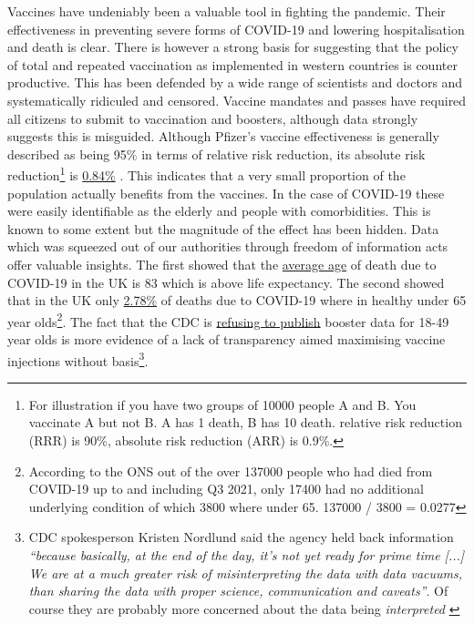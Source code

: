 \documentclass[11pt,a4paper,notitlepage]{report}
\begin{document}
Vaccines have undeniably been a valuable tool in fighting the pandemic. Their effectiveness in preventing severe forms of COVID-19 and lowering hospitalisation and death is clear. There is however a strong basis for suggesting that the policy of total and repeated vaccination as implemented in western countries is counter productive. This has been defended by a wide range of scientists and doctors and systematically ridiculed and censored. Vaccine mandates and passes have required all citizens to submit to vaccination and boosters, although data strongly suggests this is misguided. Although Pfizer's vaccine effectiveness is generally described as being 95\% in terms of relative risk reduction, its absolute risk reduction\footnote{For illustration if you have two groups of 10000 people A and B. You vaccinate A but not B. A has 1 death, B has 10 death. relative risk reduction (RRR) is 90\%, absolute risk reduction (ARR) is 0.9\%.} is \href{https://www.thelancet.com/journals/lanmic/article/PIIS2666-5247(21)00069-0/fulltext}{0.84\%} \cite{lancet20042021}. This indicates that a very small proportion of the population actually benefits from the vaccines. In the case of COVID-19 these were easily identifiable as the elderly and people with comorbidities. This is known to some extent but the magnitude of the effect has been hidden. Data which was squeezed out of our authorities through freedom of information acts offer valuable insights. The first showed that the \href{https://www.ons.gov.uk/aboutus/transparencyandgovernance/freedomofinformationfoi/averageageofthosewhohaddiedwithcovid19}{average age} of death due to COVID-19 in the UK is 83 \cite{freedomofinformationfoi11012021} which is above life expectancy. The second showed that in the UK only \href{https://www.ons.gov.uk/aboutus/transparencyandgovernance/freedomofinformationfoi/deathsfromcovid19withnootherunderlyingcauses}{2.78\%} \cite{freedomofinformationfoi16122021} of deaths due to COVID-19 where in healthy under 65 year olds\footnote{According to the ONS \cite{freedomofinformationfoi16122021} out of the over 137000 people who had died from COVID-19 up to and including Q3 2021, only 17400 had no additional underlying condition of which 3800 where under 65. 137000 / 3800 = 0.0277}. The fact that the CDC is \href{https://www.webmd.com/lung/news/20220222/report-cdc-not-publishing-large-amounts-of-covid-19-data}{refusing to publish} \cite{webmd22022022} booster data for 18-49 year olds is more evidence of a lack of transparency aimed maximising vaccine injections without basis\footnote{CDC spokesperson Kristen Nordlund said the agency held back information \textit{“because basically, at the end of the day, it’s not yet ready for prime time [...] We are at a much greater risk of misinterpreting the data with data vacuums, than sharing the data with proper science, communication and caveats”}. Of course they are probably more concerned about the data being \textit{interpreted} \cite{webmd22022022}}.
\end{document}
